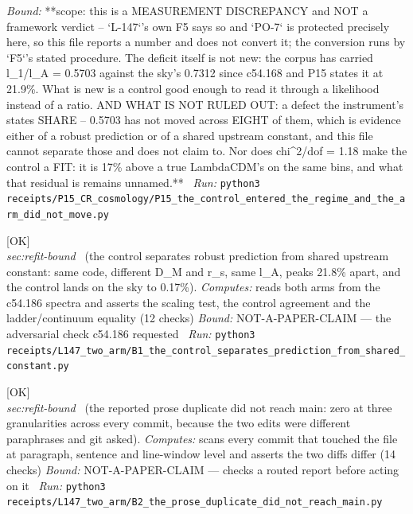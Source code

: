 \begin{description}
 \emph{Bound:} **scope: this is a MEASUREMENT DISCREPANCY and NOT a framework verdict -- `L-147`'s own F5 says so and `PO-7` is protected precisely here, so this file reports a number and does not convert it; the conversion runs by `F5`'s stated procedure. The deficit itself is not new: the corpus has carried l\_1/l\_A = 0.5703 against the sky's 0.7312 since c54.168 and P15 states it at 21.9\%. What is new is a control good enough to read it through a likelihood instead of a ratio. AND WHAT IS NOT RULED OUT: a defect the instrument's states SHARE -- 0.5703 has not moved across EIGHT of them, which is evidence either of a robust prediction or of a shared upstream constant, and this file cannot separate those and does not claim to. Nor does chi\textasciicircum{}2/dof = 1.18 make the control a FIT: it is 17\% above a true LambdaCDM's on the same bins, and what that residual is remains unnamed.**
\ \emph{Run:} \texttt{python3 receipts/P15\_CR\_cosmology/P15\_the\_control\_entered\_the\_regime\_and\_the\_arm\_did\_not\_move.py}
\item[\label{rcpt:B1_the_control_separates_prediction_from_shared_constant}\texttt{B1\_the\_control\_separates\_prediction\_from\_shared\_constant}]\hfill\textsf{[OK]}\\
\textit{sec:refit-bound} \ (the control separates robust prediction from shared upstream constant: same code, different D\_M and r\_s, same l\_A, peaks 21.8\% apart, and the control lands on the sky to 0.17\%). 
\emph{Computes:} reads both arms from the c54.186 spectra and asserts the scaling test, the control agreement and the ladder/continuum equality (12 checks)
 \emph{Bound:} NOT-A-PAPER-CLAIM --- the adversarial check c54.186 requested
\ \emph{Run:} \texttt{python3 receipts/L147\_two\_arm/B1\_the\_control\_separates\_prediction\_from\_shared\_constant.py}
\item[\label{rcpt:B2_the_prose_duplicate_did_not_reach_main}\texttt{B2\_the\_prose\_duplicate\_did\_not\_reach\_main}]\hfill\textsf{[OK]}\\
\textit{sec:refit-bound} \ (the reported prose duplicate did not reach main: zero at three granularities across every commit, because the two edits were different paraphrases and git asked). 
\emph{Computes:} scans every commit that touched the file at paragraph, sentence and line-window level and asserts the two diffs differ (14 checks)
 \emph{Bound:} NOT-A-PAPER-CLAIM --- checks a routed report before acting on it
\ \emph{Run:} \texttt{python3 receipts/L147\_two\_arm/B2\_the\_prose\_duplicate\_did\_not\_reach\_main.py}

\end{description}

